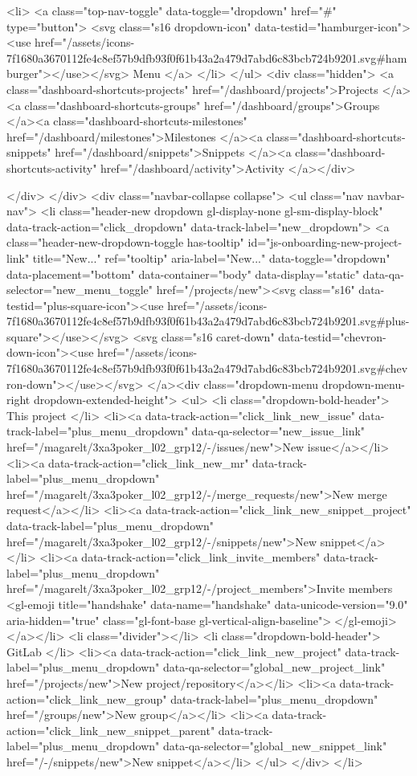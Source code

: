 {{<li>
<a class="top-nav-toggle" data-toggle="dropdown" href="#" type="button">
<svg class="s16 dropdown-icon" data-testid="hamburger-icon"><use href="/assets/icons-7f1680a3670112fe4c8ef57b9dfb93f0f61b43a2a479d7abd6c83bcb724b9201.svg#hamburger"></use></svg>
Menu
</a>
</li>
</ul>
<div class="hidden">
<a class="dashboard-shortcuts-projects" href="/dashboard/projects">Projects
</a><a class="dashboard-shortcuts-groups" href="/dashboard/groups">Groups
</a><a class="dashboard-shortcuts-milestones" href="/dashboard/milestones">Milestones
</a><a class="dashboard-shortcuts-snippets" href="/dashboard/snippets">Snippets
</a><a class="dashboard-shortcuts-activity" href="/dashboard/activity">Activity
</a></div>

</div>
</div>
<div class="navbar-collapse collapse">
<ul class="nav navbar-nav">
<li class="header-new dropdown gl-display-none gl-sm-display-block" data-track-action="click_dropdown" data-track-label="new_dropdown">
<a class="header-new-dropdown-toggle has-tooltip" id="js-onboarding-new-project-link" title="New..." ref="tooltip" aria-label="New..." data-toggle="dropdown" data-placement="bottom" data-container="body" data-display="static" data-qa-selector="new_menu_toggle" href="/projects/new"><svg class="s16" data-testid="plus-square-icon"><use href="/assets/icons-7f1680a3670112fe4c8ef57b9dfb93f0f61b43a2a479d7abd6c83bcb724b9201.svg#plus-square"></use></svg>
<svg class="s16 caret-down" data-testid="chevron-down-icon"><use href="/assets/icons-7f1680a3670112fe4c8ef57b9dfb93f0f61b43a2a479d7abd6c83bcb724b9201.svg#chevron-down"></use></svg>
</a><div class="dropdown-menu dropdown-menu-right dropdown-extended-height">
<ul>
<li class="dropdown-bold-header">
This project
</li>
<li><a data-track-action="click_link_new_issue" data-track-label="plus_menu_dropdown" data-qa-selector="new_issue_link" href="/magarelt/3xa3poker_l02_grp12/-/issues/new">New issue</a></li>
<li><a data-track-action="click_link_new_mr" data-track-label="plus_menu_dropdown" href="/magarelt/3xa3poker_l02_grp12/-/merge_requests/new">New merge request</a></li>
<li><a data-track-action="click_link_new_snippet_project" data-track-label="plus_menu_dropdown" href="/magarelt/3xa3poker_l02_grp12/-/snippets/new">New snippet</a></li>
<li><a data-track-action="click_link_invite_members" data-track-label="plus_menu_dropdown" href="/magarelt/3xa3poker_l02_grp12/-/project_members">Invite members <gl-emoji title="handshake" data-name="handshake" data-unicode-version="9.0" aria-hidden="true" class="gl-font-base gl-vertical-align-baseline">🤝</gl-emoji></a></li>
<li class="divider"></li>
<li class="dropdown-bold-header">
GitLab
</li>
<li><a data-track-action="click_link_new_project" data-track-label="plus_menu_dropdown" data-qa-selector="global_new_project_link" href="/projects/new">New project/repository</a></li>
<li><a data-track-action="click_link_new_group" data-track-label="plus_menu_dropdown" href="/groups/new">New group</a></li>
<li><a data-track-action="click_link_new_snippet_parent" data-track-label="plus_menu_dropdown" data-qa-selector="global_new_snippet_link" href="/-/snippets/new">New snippet</a></li>
</ul>
</div>
</li>

}}
